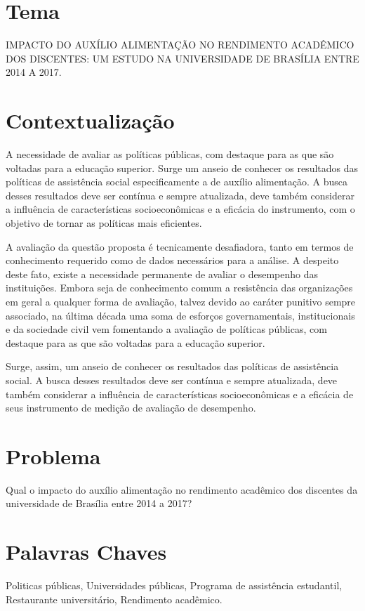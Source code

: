 \section{Tema}%
IMPACTO DO AUXÍLIO ALIMENTAÇÃO NO RENDIMENTO ACADÊMICO DOS DISCENTES: UM ESTUDO NA UNIVERSIDADE DE BRASÍLIA ENTRE 2014 A 2017.

\section{Contextualização}%
A necessidade de avaliar as políticas públicas, com destaque para as que são voltadas para a educação superior. Surge um anseio de conhecer os resultados das políticas de assistência social especificamente a de auxílio alimentação. A busca desses resultados deve ser contínua e sempre atualizada, deve também considerar a influência de características socioeconômicas e a eficácia do instrumento, com o objetivo de tornar as políticas mais eficientes.


A avaliação da questão proposta é tecnicamente desafiadora, tanto em termos de conhecimento requerido como de dados necessários para a análise. A despeito deste fato, existe a necessidade permanente de avaliar o desempenho das instituições. Embora seja de conhecimento comum a resistência das organizações em geral a qualquer forma de avaliação, talvez devido ao caráter punitivo sempre associado, na última década uma soma de esforços governamentais, institucionais e da sociedade civil vem fomentando a avaliação de  políticas públicas, com destaque para as que são voltadas para a educação superior.


Surge, assim, um anseio de conhecer os resultados das políticas de assistência social. A busca desses resultados deve ser contínua e sempre atualizada, deve também considerar a influência de características socioeconômicas e a eficácia de seus instrumento de medição de avaliação de desempenho.

\section{Problema}%
Qual o impacto do auxílio alimentação no rendimento acadêmico dos discentes da universidade de Brasília entre 2014 a 2017?

\section{Palavras Chaves}%
Politicas públicas, Universidades públicas, Programa de assistência estudantil, Restaurante universitário, Rendimento acadêmico.


